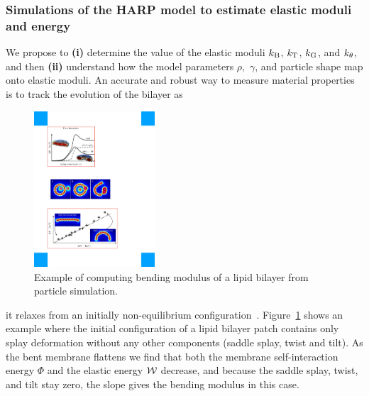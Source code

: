 \subsubsection{Simulations of the HARP model to estimate elastic moduli and energy}
We propose to
%
%
%
{\bf (i)} determine the value of the elastic moduli $k_{\mathrm{B}}$,
$k_{\mathrm{T}}$, $k_{\mathrm{G}}$, and $k_{\theta}$, and then {\bf (ii)} understand how the model parameters $\rho,$ $\gamma$, and particle shape map onto elastic moduli. 
An accurate and robust way to measure material properties is to track the evolution of the bilayer as
%
\begin{figure}
\vspace{-0.3cm}
\centerline{\includegraphics[width=0.4\textwidth]{Figures/Flattening.pdf}}
\vspace{-0.2cm}
\caption{\label{fig:flattening} \footnotesize Example of computing
  bending modulus of a lipid bilayer from particle simulation.}
\end{figure}
it relaxes from an initially non-equilibrium
configuration~\cite{PhysRevLett.117.188102}. Figure~\ref{fig:flattening}
shows an example where the initial configuration of a lipid bilayer
patch contains only splay deformation without any other components
(saddle splay, twist and tilt). As the bent membrane flattens we find
that both the membrane self-interaction energy $\Phi$ and the elastic
energy ${\cal W}$ decrease, and because the saddle splay, twist, and
tilt stay zero, the slope gives the bending modulus in this case. 


